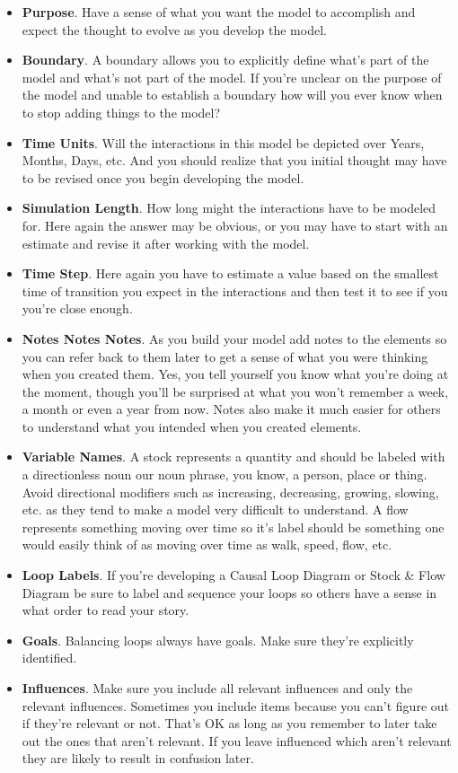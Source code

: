 \documentclass[]{memoir}
\begin{document}
\begin{itemize}
\itemsep1pt\parskip0pt
\item
  \textbf{Purpose}. Have a sense of what you want the model to
  accomplish and expect the thought to evolve as you develop the model.
\item
  \textbf{Boundary}. A boundary allows you to explicitly define what's
  part of the model and what's not part of the model. If you're unclear
  on the purpose of the model and unable to establish a boundary how
  will you ever know when to stop adding things to the model?
\item
  \textbf{Time Units}. Will the interactions in this model be depicted
  over Years, Months, Days, etc. And you should realize that you initial
  thought may have to be revised once you begin developing the model.
\item
  \textbf{Simulation Length}. How long might the interactions have to be
  modeled for. Here again the answer may be obvious, or you may have to
  start with an estimate and revise it after working with the model.
\item
  \textbf{Time Step}. Here again you have to estimate a value based on
  the smallest time of transition you expect in the interactions and
  then test it to see if you you're close enough.
\item
  \textbf{Notes Notes Notes}. As you build your model add notes to the
  elements so you can refer back to them later to get a sense of what
  you were thinking when you created them. Yes, you tell yourself you
  know what you're doing at the moment, though you'll be surprised at
  what you won't remember a week, a month or even a year from now. Notes
  also make it much easier for others to understand what you intended
  when you created elements.
\item
  \textbf{Variable Names}. A stock represents a quantity and should be
  labeled with a directionless noun our noun phrase, you know, a person,
  place or thing. Avoid directional modifiers such as increasing,
  decreasing, growing, slowing, etc. as they tend to make a model very
  difficult to understand. A flow represents something moving over time
  so it's label should be something one would easily think of as moving
  over time as walk, speed, flow, etc.
\item
  \textbf{Loop Labels}. If you're developing a Causal Loop Diagram or
  Stock \& Flow Diagram be sure to label and sequence your loops so
  others have a sense in what order to read your story.
\item
  \textbf{Goals}. Balancing loops always have goals. Make sure they're
  explicitly identified.
\item
  \textbf{Influences}. Make sure you include all relevant influences and
  only the relevant influences. Sometimes you include items because you
  can't figure out if they're relevant or not. That's OK as long as you
  remember to later take out the ones that aren't relevant. If you leave
  influenced which aren't relevant they are likely to result in
  confusion later.
\end{itemize}
\end{document}
